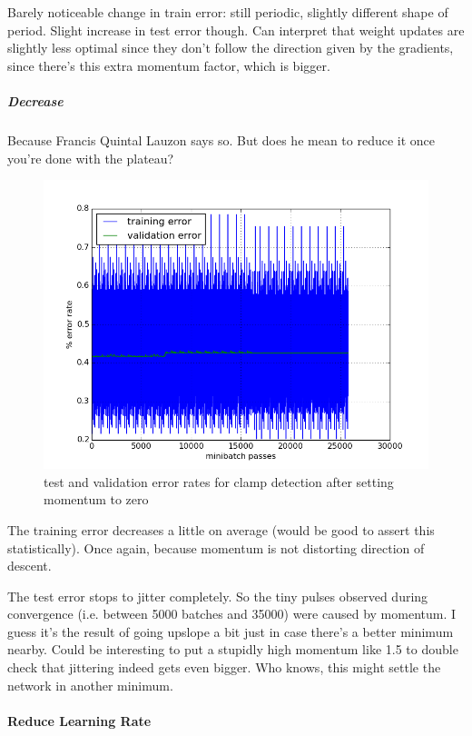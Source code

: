 \documentclass[a4paper,11pt]{article}
\begin{document}
Barely noticeable change in train error: still periodic, slightly different shape of period. Slight increase in test error though. Can interpret that weight updates are slightly less optimal since they don't follow the direction given by the gradients, since there's this extra momentum factor, which is bigger.

\subparagraph{Decrease}

Because Francis Quintal Lauzon says so. But does he mean to reduce it once you're done with the plateau?

\begin{figure}[h!]
	\centering
	\includegraphics[scale=0.5]{images/change_momentum.png}
	\caption{test and validation error rates for clamp detection after setting momentum to zero}
\end{figure}

The training error decreases a little on average (would be good to assert this statistically). Once again, because momentum is not 	distorting direction of descent.

The test error stops to jitter completely. So the tiny pulses observed during convergence (i.e. between 5000 batches and 35000) were caused by momentum. I guess it's the result of going upslope a bit just in case there's a better minimum nearby. Could be interesting to put a stupidly high momentum like 1.5 to double check that jittering indeed gets even bigger. Who knows, this might settle the network in another minimum. 


\paragraph{Reduce Learning Rate}
\end{document}
